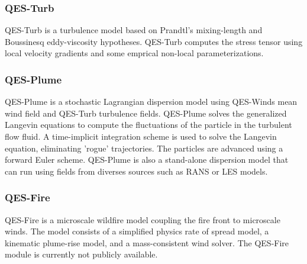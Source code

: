 \subsubsection{QES-Turb}

QES-Turb is a turbulence model based on Prandtl’s mixing-length and Boussinesq eddy-viscosity hypotheses. QES-Turb computes the stress tensor using local velocity gradients and some emprical non-local parameterizations.

\subsubsection{QES-Plume}

QES-Plume is a stochastic Lagrangian dispersion model using QES-Winds mean wind field and QES-Turb turbulence fields. QES-Plume solves the generalized Langevin equations to compute the fluctuations of the particle in the turbulent flow fluid. A time-implicit integration scheme is used to solve the Langevin equation, eliminating 'rogue' trajectories. The particles are advanced using a forward Euler scheme. QES-Plume is also a stand-alone dispersion model that can run using fields from diverses sources such as RANS or LES models. 


\subsubsection{QES-Fire}

QES-Fire is a microscale wildfire model coupling the fire front to microscale winds. The model consists of a simplified physics rate of spread model, a kinematic plume-rise model, and a mass-consistent wind solver. The QES-Fire module is currently not publicly available. 
